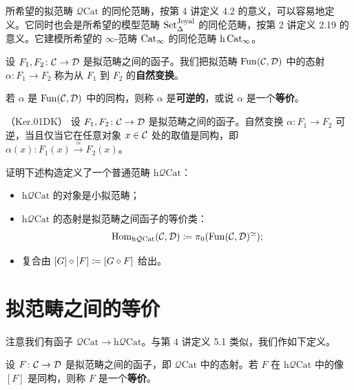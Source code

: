 \nitem\label{L5-2.1} 所希望的拟范畴 $\mathcal{Q}\mathrm{Cat}$ 的同伦范畴，按第 4 讲定义 4.2 的意义，可以容易地定义。它同时也会是所希望的模型范畴 $\operatorname{Set}^{\mathrm{Joyal}}_\Delta$ 的同伦范畴，按第 2 讲定义 2.19 的意义。它建模所希望的 $\infty$-范畴 $\operatorname{Cat}_\infty$ 的同伦范畴 $\mathrm{h}\operatorname{Cat}_\infty$。

\begin{definition}\label{L5-2.2}
设 $F_1,F_2\colon\mathcal{C}\to\mathcal{D}$ 是拟范畴之间的函子。我们把拟范畴 $\operatorname{Fun}(\mathcal{C},\mathcal{D})$ 中的态射 $\alpha\colon F_1\to F_2$ 称为从 $F_1$ 到 $F_2$ 的\textbf{自然变换}。

若 $\alpha$ 是 $\operatorname{Fun}(\mathcal{C},\mathcal{D})$ 中的同构，则称 $\alpha$ 是\textbf{可逆的}，或说 $\alpha$ 是一个\textbf{等价}。
\end{definition}

\begin{theorem}\label{L5-2.3}（Ker.01DK）
设 $F_1,F_2\colon\mathcal{C}\to\mathcal{D}$ 是拟范畴之间的函子。自然变换 $\alpha\colon F_1\to F_2$ 可逆，当且仅当它在任意对象 $x\in\mathcal{C}$ 处的取值是同构，即 $\alpha(x)\colon F_1(x)\xrightarrow{\ \simeq\ }F_2(x)$。
\end{theorem}

\begin{exercise}\label{L5-2.4}
证明下述构造定义了一个普通范畴 $\mathrm{h}\mathcal{Q}\mathrm{Cat}$：
\begin{itemize}[leftmargin=2.2em,itemsep=0.1em]
\item $\mathrm{h}\mathcal{Q}\mathrm{Cat}$ 的对象是小拟范畴；
\item $\mathrm{h}\mathcal{Q}\mathrm{Cat}$ 的态射是拟范畴之间函子的等价类：
\[
\operatorname{Hom}_{\mathrm{h}\mathcal{Q}\mathrm{Cat}}(\mathcal{C},\mathcal{D})\coloneqq\pi_0(\operatorname{Fun}(\mathcal{C},\mathcal{D})^{\simeq});
\]
\item 复合由 $[G]\circ[F]\coloneqq[G\circ F]$ 给出。
\end{itemize}
\end{exercise}

\section{拟范畴之间的等价}

\nitem\label{L5-3.1} 注意我们有函子 $\mathcal{Q}\mathrm{Cat}\to\mathrm{h}\mathcal{Q}\mathrm{Cat}$。与第 4 讲定义 5.1 类似，我们作如下定义。

\begin{definition}\label{L5-3.2}
设 $F\colon\mathcal{C}\to\mathcal{D}$ 是拟范畴之间的函子，即 $\mathcal{Q}\mathrm{Cat}$ 中的态射。若 $F$ 在 $\mathrm{h}\mathcal{Q}\mathrm{Cat}$ 中的像 $[F]$ 是同构，则称 $F$ 是一个\textbf{等价}。
\end{definition}

